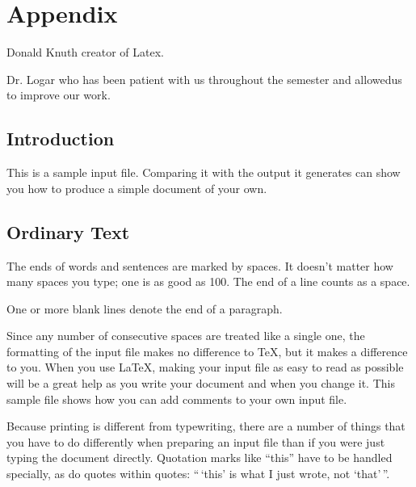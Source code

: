 
\chapter{Appendix}

Donald Knuth creator of Latex.

Dr. Logar who has been patient with us throughout the semester and allowedus to improve our work.  

\section{Introduction}
This is a sample input file.  Comparing it with the output it
generates can show you how to produce a simple document of
your own.

\section{Ordinary Text}  %

The ends  of words and sentences are marked 
  by   spaces. It  doesn't matter how many 
spaces    you type; one is as good as 100.  The
end of   a line counts as a space.

One   or more   blank lines denote the  end 
of  a paragraph.  

Since any number of consecutive spaces are treated like a single
one, the formatting of the input file makes no difference to
      \TeX,         %
but it makes a difference to you.  
When you use
      \LaTeX,       %
making your input file as easy to read as possible
will be a great help as you write your document and when you
change it.  This sample file shows how you can add comments to
your own input file.

Because printing is different from typewriting, there are a 
number of things that you have to do differently when preparing 
an input file than if you were just typing the document directly.  
Quotation marks like 
       ``this'' 
have to be handled specially, as do quotes within quotes: 
       ``\,`this'                  %
        is what I just 
        wrote, not  `that'\,''.  

